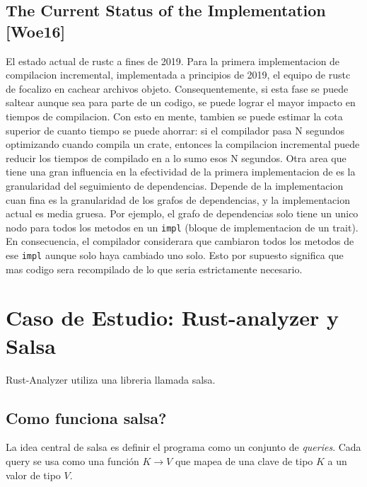 \documentclass[12pt, a4paper]{report}
\begin{document}
  \section*{The Current Status of the Implementation [Woe16]}

    El estado actual de rustc a fines de 2019.
    Para la primera implementacion de compilacion incremental, implementada a principios de 2019, el equipo de rustc de focalizo en cachear archivos objeto.
    Consequentemente, si esta fase se puede saltear aunque sea para parte de un codigo, se puede lograr el mayor impacto en tiempos de compilacion.
    Con esto en mente, tambien se puede estimar la cota superior de cuanto tiempo se puede ahorrar: si el compilador pasa N segundos optimizando cuando compila un crate, entonces la compilacion incremental puede reducir los tiempos de compilado en a lo sumo esos N segundos.
    Otra area que tiene una gran influencia en la efectividad de la primera implementacion de es la granularidad del seguimiento de dependencias.
    Depende de la implementacion cuan fina es la granularidad de los grafos de dependencias, y la implementacion actual es media gruesa.
    Por ejemplo, el grafo de dependencias solo tiene un unico nodo para todos los metodos en un \texttt{impl} (bloque de implementacion de un trait).
    En consecuencia, el compilador considerara que cambiaron todos los metodos de ese \texttt{impl} aunque solo haya cambiado uno solo.
    Esto por supuesto significa que mas codigo sera recompilado de lo que seria estrictamente necesario.
    \cite{rust_blog_incremental_compilation}

\chapter*{Caso de Estudio: Rust-analyzer y Salsa}

  Rust-Analyzer utiliza una libreria llamada salsa.

  \section*{Como funciona salsa?}

    La idea central de salsa es definir el programa como un conjunto de \textit{queries}.
    Cada query se usa como una función $K \to V$ que mapea de una clave de tipo $K$ a un valor de tipo $V$.
\end{document}
